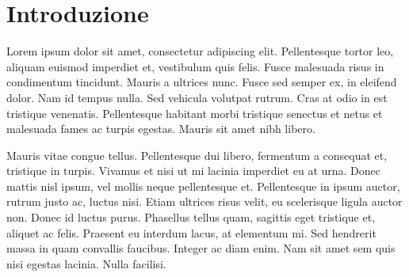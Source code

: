 \chapter{Introduzione}

Lorem ipsum dolor sit amet, consectetur adipiscing elit. Pellentesque tortor leo, aliquam euismod imperdiet et, vestibulum quis felis. Fusce malesuada risus in condimentum tincidunt. Mauris a ultrices nunc. Fusce sed semper ex, in eleifend dolor. Nam id tempus nulla. Sed vehicula volutpat rutrum. Cras at odio in est tristique venenatis. Pellentesque habitant morbi tristique senectus et netus et malesuada fames ac turpis egestas. Mauris sit amet nibh libero.

Mauris vitae congue tellus. Pellentesque dui libero, fermentum a consequat et, tristique in turpis. Vivamus et nisi ut mi lacinia imperdiet eu at urna. Donec mattis nisl ipsum, vel mollis neque pellentesque et. Pellentesque in ipsum auctor, rutrum justo ac, luctus nisi. Etiam ultrices risus velit, eu scelerisque ligula auctor non. Donec id luctus purus. Phasellus tellus quam, sagittis eget tristique et, aliquet ac felis. Praesent eu interdum lacus, at elementum mi. Sed hendrerit massa in quam convallis faucibus. Integer ac diam enim. Nam sit amet sem quis nisi egestas lacinia. Nulla facilisi. 

